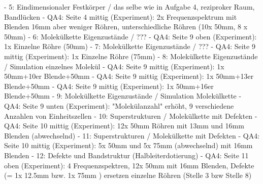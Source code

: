 - 5: Eindimensionaler Festkörper / das selbe wie in Aufgabe 4, reziproker Raum, Bandlücken
    - QA4: Seite 4 mittig (Experiment): 2x Frequenzspektrum mit Blenden 16mm aber weniger Röhren, unterschiedliche Röhren (10x 50mm, 8 x 50mm)
- 6: Molekülkette Eigenzustände / ???
    - QA4: Seite 9 oben (Experiment): 1x Einzelne Röhre (50mm)
- 7: Molekülkette Eigenzustände / ???
    - QA4: Seite 9 mittig (Experiment): 1x Einzelne Röhre (75mm)
- 8: Molekülkette Eigenzustände / Simulation einzelnes Molekül
    - QA4: Seite 9 mittig (Experiment): 1x 50mm+10er Blende+50mm
    - QA4: Seite 9 mittig (Experiment): 1x 50mm+13er Blende+50mm
    - QA4: Seite 9 mittig (Experiment): 1x 50mm+16er Blende+50mm
- 9: Molekülkette Eigenzustände / Simulation Molekülkette
    - QA4: Seite 9 unten (Experiment): "Molekülanzahl" erhöht, 9 verschiedene Anzahlen von Einheitszellen
- 10: Superstrukturen / Molekülkette mit Defekten
    - QA4: Seite 10 mittig (Experiment): 12x 50mm Röhren mit 13mm und 16mm Blenden (abwechselnd)
- 11: Superstrukturen / Molekülkette mit Defekten
    - QA4: Seite 10 mittig (Experiment): 5x 50mm und 5x 75mm (abwechselnd) mit 16mm Blenden
- 12: Defekte und Bandstruktur (Halbleiterdotierung)
    - QA4: Seite 11 oben (Experiment): 4 Frequenzspektren, 12x 50mm mit 16mm Blenden, Defekte (= 1x 12.5mm bzw. 1x 75mm ) ersetzen einzelne Röhren (Stelle 3 bzw Stelle 8)
